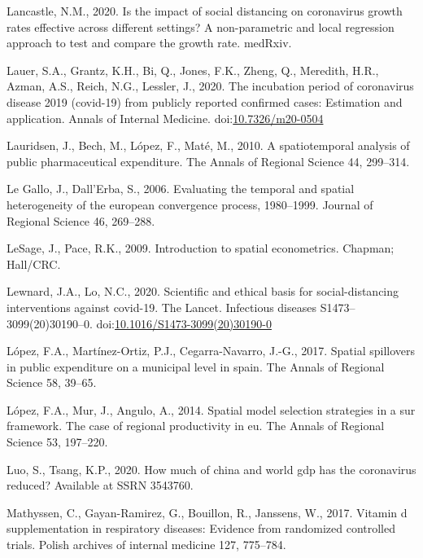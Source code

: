 \documentclass[]{elsarticle} %
\begin{document}
\leavevmode\hypertarget{ref-Lancastle2020impact}{}%
Lancastle, N.M., 2020. Is the impact of social distancing on coronavirus
growth rates effective across different settings? A non-parametric and
local regression approach to test and compare the growth rate. medRxiv.

\leavevmode\hypertarget{ref-Lauer2020incubation}{}%
Lauer, S.A., Grantz, K.H., Bi, Q., Jones, F.K., Zheng, Q., Meredith,
H.R., Azman, A.S., Reich, N.G., Lessler, J., 2020. The incubation period
of coronavirus disease 2019 (covid-19) from publicly reported confirmed
cases: Estimation and application. Annals of Internal Medicine.
doi:\href{https://doi.org/10.7326/m20-0504}{10.7326/m20-0504}

\leavevmode\hypertarget{ref-Lauridsen2010spatiotemporal}{}%
Lauridsen, J., Bech, M., López, F., Maté, M., 2010. A spatiotemporal
analysis of public pharmaceutical expenditure. The Annals of Regional
Science 44, 299--314.

\leavevmode\hypertarget{ref-Legallo2006evaluating}{}%
Le Gallo, J., Dall'Erba, S., 2006. Evaluating the temporal and spatial
heterogeneity of the european convergence process, 1980--1999. Journal
of Regional Science 46, 269--288.

\leavevmode\hypertarget{ref-LeSage2009introduction}{}%
LeSage, J., Pace, R.K., 2009. Introduction to spatial econometrics.
Chapman; Hall/CRC.

\leavevmode\hypertarget{ref-Lewnard2020scientific}{}%
Lewnard, J.A., Lo, N.C., 2020. Scientific and ethical basis for
social-distancing interventions against covid-19. The Lancet. Infectious
diseases S1473--3099(20)30190--0.
doi:\href{https://doi.org/10.1016/S1473-3099(20)30190-0}{10.1016/S1473-3099(20)30190-0}

\leavevmode\hypertarget{ref-Lopez2017spatial}{}%
López, F.A., Martínez-Ortiz, P.J., Cegarra-Navarro, J.-G., 2017. Spatial
spillovers in public expenditure on a municipal level in spain. The
Annals of Regional Science 58, 39--65.

\leavevmode\hypertarget{ref-Lopez2014spatial}{}%
López, F.A., Mur, J., Angulo, A., 2014. Spatial model selection
strategies in a sur framework. The case of regional productivity in eu.
The Annals of Regional Science 53, 197--220.

\leavevmode\hypertarget{ref-Luo2020how}{}%
Luo, S., Tsang, K.P., 2020. How much of china and world gdp has the
coronavirus reduced? Available at SSRN 3543760.

\leavevmode\hypertarget{ref-Mathyssen2017vitamin}{}%
Mathyssen, C., Gayan-Ramirez, G., Bouillon, R., Janssens, W., 2017.
Vitamin d supplementation in respiratory diseases: Evidence from
randomized controlled trials. Polish archives of internal medicine 127,
775--784.
\end{document}
